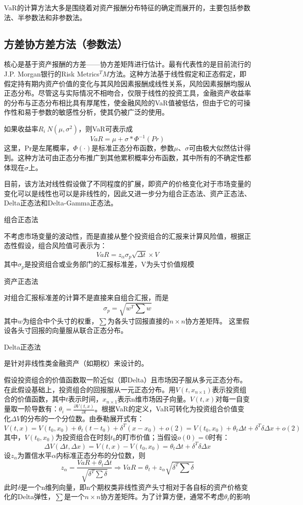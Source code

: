 \documentclass[UTF8]{ctexart}
\newcommand \qd[1] {\begin{qds} {#1} \end{qds}}
\begin{document}
VaR的计算方法大多是围绕着对资产报酬分布特征的确定而展开的，主要包括参数法、半参数法和非参数法。

\subsection{方差协方差方法（参数法）}
核心是基于资产报酬的方差——协方差矩阵进行估计。最有代表性的是目前流行的J.P. Morgan银行的Risk Metrics$^TM$方法。这种方法基于线性假定和正态假定，即假定持有期内资产价值的变化与其风险因素报酬成线性关系，风险因素报酬均服从正态分布。尽管这与实际情况不相吻合，仅限于线性的投资工具，金融资产收益率的分布与正态分布相比具有厚尾性，使金融风险的VaR值被低估，但由于它的可操作性和易于参数的敏感性分析，使其仍被广泛的使用。

如果收益率$R_i~N(\mu,\sigma^2)$，则VaR可表示成$$VaR=\mu+\sigma*\Phi^{-1}(Pr)$$这里，Pr是左尾概率，$\Phi(·)$是标准正态分布函数，参数$\mu、\sigma$可由极大似然估计得到。这种方法可由正态分布推广到其他累积概率分布函数，其中所有的不确定性都体现在$\sigma$上。

目前，该方法对线性假设做了不同程度的扩展，即资产的价格变化对于市场变量的变化可以是线性也可以是非线性的，因此又进一步分为组合正态法、资产正态法、Delta正态法和Delta-Gamma正态法。

\qd{组合正态法}不考虑市场变量的波动性，而是直接从整个投资组合的汇报来计算风险值，根据正态性假设，组合风险值可表示为：
$$VaR=z_\alpha \sigma_p \sqrt{\Delta t} \times V$$
其中$\sigma_p$是投资组合或业务部门的汇报标准差，V为头寸价值规模

\qd{资产正态法}对组合汇报标准差的计算不是直接来自组合汇报，而是
$$\sigma_p=\sqrt{w^T\sum w}$$
其中$w$为组合中个头寸的权重，$\sum$为各头寸回报直接的$n \times n$协方差矩阵。
这里假设各头寸回报的向量服从联合正态分布。

\qd{Delta正态法}是针对非线性类金融资产（如期权）来设计的。

假设投资组合的价值函数取一阶近似（即Delta）且市场因子服从多元正态分布。在此假设基础上，投资组合的回报服从一元正态分布。用$V(t,x_{n \times 1})$表示投资组合的价值函数，其中$t$表示时间，$x_{n \times 1}$表示n维市场因子向量。$V(t,x)$对每一自变量取一阶导数有：$\theta_i=\frac {\partial V(t,x)} {\partial t}$。根据VaR的定义，VaR可转化为投资组合价值变化$\Delta V$的分布的一个分位数。由泰勒展开式有：$$V(t,x)=V(t_0,x_0)+\theta _t(t-t_0)+\delta ^T(x-x_0)+o(2)=V(t_0,x_0)+\theta _t \Delta t+\delta ^T \delta \Delta x+o(2)$$其中，$V(t_0,x_0)$为投资组合在时刻$t_0$的盯市价值；当假设$o(0)=0$时有：$$\Delta V(\Delta t, \Delta x)=V(t,x)-V(t_0,x_0)=\theta _t \Delta t+\delta ^T \delta \Delta x$$
设$z_{\alpha}$为置信水平$\alpha$内标准正态分布的分位数，则$$z_{\alpha}=\frac {VaR+\theta_t \Delta t} {\sqrt{\delta^T \sum \delta}} \Rightarrow VaR=\theta_t+z_{\alpha}\sqrt{\delta^T \sum \delta}$$
此时$\delta$是一个n维列向量，即n个期权类非线性资产头寸相对于各自标的资产价格变化的Delta弹性，$\sum$是一个$n \times n$协方差矩阵。为了计算方便，通常不考虑$\theta_t$的影响
\end{document}
